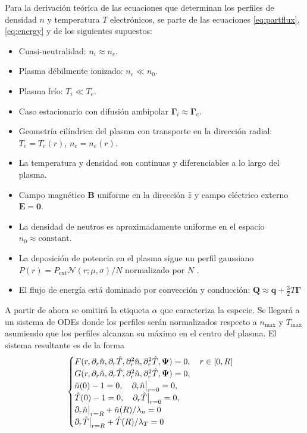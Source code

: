Para la derivación teórica de las ecuaciones que determinan los perfiles de densidad $n$ y temperatura $T$ electrónicos, se parte de las ecuaciones \eqref{eq:partflux}, \eqref{eq:energy} y de los siguientes supuestos:
\begin{itemize}[noitemsep]
\item Cuasi-neutralidad: $n_i \approx n_e$.
\item Plasma débilmente ionizado: $n_e \ll n_0$.
\item Plasma frío: $T_i \ll T_e$.
\item Caso estacionario con difusión ambipolar $\bm{\Gamma}_i \approx \bm{\Gamma}_e$.
\item Geometría cilíndrica del plasma con transporte en la dirección radial: $T_e = T_e(r)$, $n_e = n_e(r)$.
\item La temperatura y densidad son continuas y diferenciables a lo largo del plasma.
\item Campo magnético $\bm{B}$ uniforme en la dirección $\hat{z}$ y campo eléctrico externo $\bm{E} = \bm{0}$.
\item La densidad de neutros es aproximadamente uniforme en el espacio $n_0 \approx \text{constant}$.
\item La deposición de potencia en el plasma sigue un perfil gaussiano $P(r) = P_\text{ext} \mathcal{N}(r; \mu, \sigma) / N$ normalizado por $N$ . 
\item El flujo de energía está dominado por convección y conducción: $\bm{Q} \approx \bm{q} + \frac{3}{2}T\bm{\Gamma}$
\end{itemize}
A partir de ahora se omitirá la etiqueta $\alpha$ que caracteriza la especie. Se llegará a un sistema de ODEs donde los perfiles serán normalizados respecto a $n_\text{max}$ y $T_\text{max}$ asumiendo que los perfiles alcanzan su máximo en el centro del plasma. El sistema resultante es de la forma
\begin{equation}\label{eq:odesys}
	\begin{cases}
		F(r, \partial_r \hat{n}, \partial_r \hat{T}, \partial_r^2 \hat{n}, \partial_r^2\hat{T}, \bm{\Psi}) = 0, \quad r \in [0, R]\\
		G(r, \partial_r \hat{n}, \partial_r \hat{T}, \partial_r^2 \hat{n}, \partial_r^2\hat{T}, \bm{\Psi}) = 0, \\
		\hat{n}(0) - 1 = 0, \quad \partial_r \hat{n}\big{|}_{r = 0} = 0, \\
		\hat{T}(0) - 1 = 0, \quad \partial_r \hat{T}\big{|}_{r = 0} = 0,\\
		\partial_r \hat{n} \big{|}_{r = R} + \hat{n}(R)/\lambda_n = 0\\
		\partial_r \hat{T} \big{|}_{r = R}  + \hat{T}(R)/\lambda_T = 0
	\end{cases}
\end{equation}

